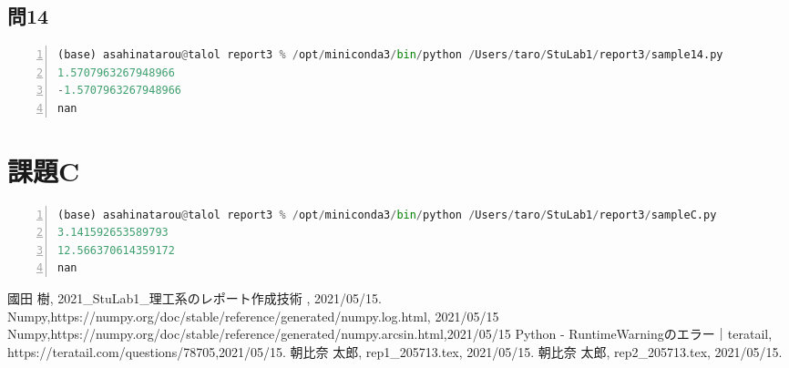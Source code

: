\documentclass[a4paper, 11pt, titlepage]{jsarticle}
\begin{document}
\subsection{問14}


\begin{lstlisting}[language=Python, numbers=left, breaklines=true, basicstyle=\ttfamily\footnotesize, frame=single, caption=実行結果14,label=result]
(base) asahinatarou@talol report3 % /opt/miniconda3/bin/python /Users/taro/StuLab1/report3/sample14.py
1.5707963267948966
-1.5707963267948966
nan
\end{lstlisting}

\section{課題C}


\begin{lstlisting}[language=Python, numbers=left, breaklines=true, basicstyle=\ttfamily\footnotesize, frame=single, caption=実行結果C,label=result]
(base) asahinatarou@talol report3 % /opt/miniconda3/bin/python /Users/taro/StuLab1/report3/sampleC.py
3.141592653589793
12.566370614359172
nan
\end{lstlisting}


\begin{thebibliography}{99}
 國田 樹, 2021\_StuLab1\_理工系のレポート作成技術 , 2021/05/15.
 Numpy,https://numpy.org/doc/stable/reference/generated/numpy.log.html, 2021/05/15
 Numpy,https://numpy.org/doc/stable/reference/generated/numpy.arcsin.html,2021/05/15
 Python - RuntimeWarningのエラー｜teratail, https://teratail.com/questions/78705,2021/05/15.
 朝比奈 太郎, rep1\_205713.tex, 2021/05/15.
 朝比奈 太郎, rep2\_205713.tex, 2021/05/15.
\end{thebibliography}
\end{document}
